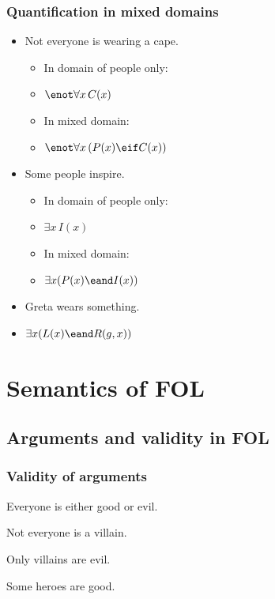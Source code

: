 \begin{frame}
\frametitle{Quantification in mixed domains}

\begin{itemize}[<+->]
\item Not everyone is wearing a cape.
\begin{itemize}
  \item In domain of people only:
  \item[] \alert{$\enot \forall x\, C(x)$}
  \item In mixed domain:
  \item[] \alert{$\enot \forall x\, (P(x) \eif C(x))$}
\end{itemize}
\item Some people inspire.
\begin{itemize}[<+->]
  \item In domain of people only:
  \item[] \alert{$\exists x\,I(x)$}
  \item In mixed domain:
  \item[] \alert{$\exists x(P(x) \eand I(x))$}
\end{itemize}
\item Greta wears something.
\item[] \alert{$\exists x(L(x) \eand R(g,x))$}
\end{itemize}
\end{frame}


\newhourlecture
\newonlinelecture

\section{Semantics of FOL}

\subsection{Arguments and validity in FOL}

\begin{frame}
  \frametitle{Validity of arguments}

  \begin{earg}
    \item[] Everyone is either good or evil.
    \item[] Not everyone is a villain.
    \item[] Only villains are evil.
    \item[\therefore] Some heroes are good.
  \end{earg}

\end{frame}

